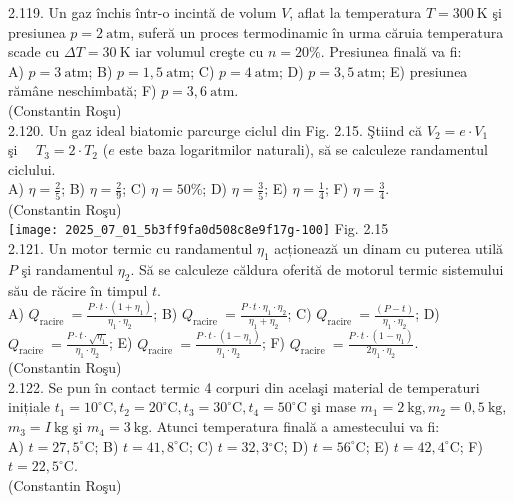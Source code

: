 2.119. Un gaz închis într-o incintă de volum $V$, aflat la temperatura $T=300 \mathrm{~K}$ şi presiunea $p=2 \mathrm{~atm}$, suferă un proces termodinamic în urma căruia temperatura scade cu $\Delta T=30 \mathrm{~K}$ iar volumul creşte cu $n=20 \%$. Presiunea finală va fi:\\ A) $p=3 \mathrm{~atm}$; B) $p=1,5 \mathrm{~atm}$; C) $p=4 \mathrm{~atm}$; D) $p=3,5 \mathrm{~atm}$; E) presiunea rămâne neschimbată; F) $p=3,6 \mathrm{~atm}$.\\ (Constantin Roşu)\\

2.120. Un gaz ideal biatomic parcurge ciclul din Fig. 2.15. Ştiind că $V_{2}=e \cdot V_{1} \quad$ şi $\quad T_{3}=2 \cdot T_{2}$ ($e$ este baza logaritmilor naturali), să se calculeze randamentul ciclului.\\ A) $\eta=\frac{2}{5}$; B) $\eta=\frac{2}{9}$; C) $\eta=50 \%$; D) $\eta=\frac{3}{5}$; E) $\eta=\frac{1}{4}$; F) $\eta=\frac{3}{4}$.\\ (Constantin Roşu)\\ \texttt{[image: 2025\_07\_01\_5b3ff9fa0d508c8e9f17g-100]} Fig. 2.15\\

2.121. Un motor termic cu randamentul $\eta_{1}$ acționează un dinam cu puterea utilă $P$ şi randamentul $\eta_{2}$. Să se calculeze căldura oferită de motorul termic sistemului său de răcire în timpul $t$.\\ A) $Q_{\text {racire }}=\frac{P \cdot t \cdot\left(1+\eta_{1}\right)}{\eta_{1} \cdot \eta_{2}}$; B) $Q_{\text {racire }}=\frac{P \cdot t \cdot \eta_{1} \cdot \eta_{2}}{\eta_{1}+\eta_{2}}$; C) $Q_{\text {racire }}=\frac{(P-t)}{\eta_{1} \cdot \eta_{2}}$; D) $Q_{\text {racire }}=\frac{P \cdot t \cdot \sqrt{\eta_{1}}}{\eta_{1} \cdot \eta_{2}}$; E) $Q_{\text {racire }}=\frac{P \cdot t \cdot\left(1-\eta_{1}\right)}{\eta_{1} \cdot \eta_{2}}$; F) $Q_{\text {racire }}=\frac{P \cdot t \cdot\left(1-\eta_{1}\right)}{2 \eta_{1} \cdot \eta_{2}}$.\\ (Constantin Roşu)\\

2.122. Se pun în contact termic 4 corpuri din acelaşi material de temperaturi inițiale $t_{1}=10^{\circ} \mathrm{C}, t_{2}=20^{\circ} \mathrm{C}, t_{3}=30^{\circ} \mathrm{C}, t_{4}=50^{\circ} \mathrm{C}$ şi mase $m_{1}=2 \mathrm{~kg}, m_{2}=0,5 \mathrm{~kg}$, $m_{3}=I \mathrm{~kg}$ şi $m_{4}=3 \mathrm{~kg}$. Atunci temperatura finală a amestecului va fi:\\ A) $t=27,5^{\circ} \mathrm{C}$; B) $t=41,8^{\circ} \mathrm{C}$; C) $t=32,3{ }^{\circ} \mathrm{C}$; D) $t=56^{\circ} \mathrm{C}$; E) $t=42,4^{\circ} \mathrm{C}$; F) $t=22,5^{\circ} \mathrm{C}$.\\ (Constantin Roşu)\\

